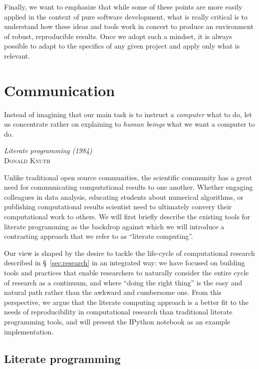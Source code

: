 \documentclass[ChapterTOCs,krantz2]{krantz} %
\begin{document}
Finally, we want to emphasize that while some of these points are more easily
applied in the context of pure software development, what is really critical is
to understand how these ideas and tools work in concert to produce an
environment of robust, reproducible results.  Once we adopt such a mindset, it
is always possible to adapt to the specifics of any given project and apply
only what is relevant.

\section{\label{sec:communication}Communication}

\setlength{\epigraphrule}{0pt}
\setlength{\epigraphwidth}{.90\textwidth}
\epigraph%
{%
Instead of imagining that our main task is to instruct a \emph{computer}
what to do, let us concentrate rather on explaining to \emph{human beings}
what we want a computer to do.
}%
{\textit{Literate programming (1984)}\\ \textsc{Donald Knuth} }

Unlike traditional open source communities, the scientific community has a
great need for communicating computational results to one another. Whether
engaging colleagues in data analysis, educating students about numerical
algorithms, or publishing computational results scientist need to ultimately
convery their computational work to others.  We will first briefly describe the
existing tools for literate programming as the backdrop against which we will
introduce a contrasting approach that we refer to as ``literate computing''.

Our view is shaped by the desire to tackle the life-cycle of computational
research described in §~\ref{sec:research} in an integrated way: we have
focused on building tools and practices that enable researchers to naturally
consider the entire cycle of research as a continuum, and where ``doing the
right thing'' is the easy and natural path rather than the awkward and
cumbersome one.  From this perspective, we argue that the literate computing
approach is a better fit to the needs of reproducibility in computational
research than traditional literate programming tools, and will present the
IPython notebook as an example implementation.

\subsection{Literate programming}
\end{document}

